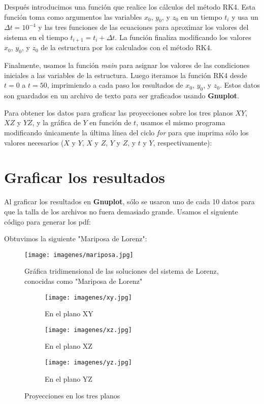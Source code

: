 \documentclass[letterpaper, 12pt]{article}
\begin{document}
{Después introducimos una función que realice los cálculos del método RK4. Esta función toma como argumentos las variables $x_0$, $y_0$, y $z_0$ en un tiempo $t_i$ y usa un $\Delta t = 10^{-4}$ y las tres funciones de las ecuaciones para aproximar los valores del sistema en el tiempo $t_{i+1} = t_i + \Delta t$. La función finaliza modificando los valores $x_0$, $y_0$, y $z_0$ de la estructura por los calculados con el método RK4.

Finalmente, usamos la función \textit{main} para asignar los valores de las condiciones iniciales a las variables de la estructura. Luego iteramos la función RK4 desde $t = 0$ a $t = 50$, imprimiendo a cada paso los resultados de $x_0$, $y_0$, y $z_0$. Estos datos son guardados en un archivo de texto para ser graficados usando \textbf{Gnuplot}.

Para obtener los datos para graficar las proyecciones sobre los tres planos $XY$, $XZ$ y $YZ$, y la gráfica de $Y$ en funci\'on de $t$, usamos el mismo programa modificando \'unicamente la \'ultima l\'inea del ciclo \textit{for} para que imprima s\'olo los valores necesarios ($X$ y $Y$, $X$ y $Z$, $Y$ y $Z$, y $t$ y $Y$, respectivamente):


\section*{Graficar los resultados}

\justify
Al graficar los resultados en \textbf{Gnuplot}, s\'olo se usaron uno de cada 10 datos para que la talla de los archivos no fuera demasiado grande. Usamos el siguiente c\'odigo para generar los pdf:

Obtuvimos la siguiente "Mariposa de Lorenz":


\begin{figure}[h]
\centering
\texttt{[image: imagenes/mariposa.jpg]}
\caption{Gr\'afica tridimensional de las soluciones del sistema de Lorenz, conocidas como "Mariposa de Lorenz"}

\begin{subfigure}{0.31\textwidth}
\texttt{[image: imagenes/xy.jpg]}
\caption{En el plano XY}
\end{subfigure}
\begin{subfigure}{0.31\textwidth}
\texttt{[image: imagenes/xz.jpg]}
\caption{En el plano XZ}
\end{subfigure}
\begin{subfigure}{0.31\textwidth}
\texttt{[image: imagenes/yz.jpg]}
\caption{En el plano YZ}
\end{subfigure}
\caption{Proyecciones en los tres planos}
\end{figure}

}
\end{document}
